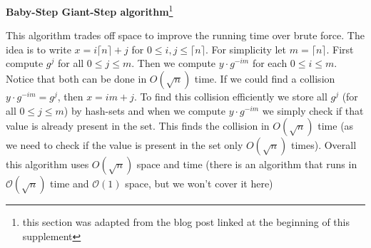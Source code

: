 \documentclass{article}
\begin{document}
    \begin{center}
        \textbf{Baby-Step Giant-Step algorithm}\footnote{this section was adapted from the blog post linked at the beginning of this supplement}
    \end{center}

    
    This algorithm trades off space to improve the running time over brute force. The idea is to write $x = i\lceil n \rceil + j$ for $0 \le i,j \le \lceil n \rceil$. For simplicity let $m = \lceil n \rceil$. First compute $g^j$ for all $0 \le j \le m$. Then we compute $y\cdot g^{-im}$ for each $0 \le i \le m$. Notice that both can be done in $O(\sqrt n )$ time. If we could find a collision $y\cdot g^{-im} = g^j$, then $x = im + j$. To find this collision efficiently we store all $g^j$ (for all $0 \le j \le m$) by hash-sets and when we compute $y\cdot g^{-im}$ we simply check if that value is already present in the set. This finds the collision in $O(\sqrt{n})$ time (as we need to check if the value is present in the set only $O(\sqrt{n})$ times). Overall this algorithm uses $O(\sqrt{n})$ space and time (there is an algorithm that runs in $\mathcal{O}(\sqrt{n})$ time and $\mathcal{O}(1)$ space, but we won't cover it here)

    
    
    
    
\end{document}

